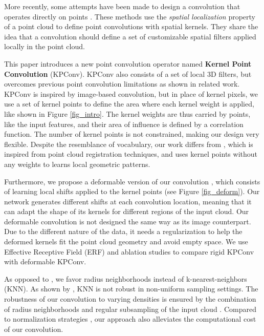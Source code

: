 \documentclass[10pt,twocolumn,letterpaper]{article}
\begin{document}
More recently, some attempts have been made to design a convolution that operates directly on points \cite{atzmon2018point, xu2018spidercnn, li2018pointcnn, hua2018pointwise, hermosilla2018monte}. These methods use the \textit{spatial localization} property of a point cloud to define point convolutions with spatial kernels. They share the idea that a convolution should define a set of customizable spatial filters applied locally in the point cloud. 

This paper introduces a new point convolution operator named \textbf{Kernel Point Convolution} (KPConv). KPConv also consists of a set of local 3D filters, but overcomes previous point convolution limitations as shown in related work. KPConv is inspired by image-based convolution, but in place of kernel pixels, we use a set of kernel points to define the area where each kernel weight is applied, like shown in Figure \ref{fig_intro}. The kernel weights are thus carried by points, like the input features, and their area of influence is defined by a correlation function. The number of kernel points is not constrained, making our design very flexible. Despite the resemblance of vocabulary, our work differs from \cite{shen2018mining}, which is inspired from point cloud registration techniques, and uses kernel points without any weights to learns local geometric patterns. 

Furthermore, we propose a deformable version of our convolution \cite{dai2017deformable}, which consists of learning local shifts applied to the kernel points (see Figure \ref{fig_deform}). Our network generates different shifts at each convolution location, meaning that it can adapt the shape of its kernels for different regions of the input cloud. Our deformable convolution is not designed the same way as its image counterpart. Due to the different nature of the data, it needs a regularization to help the deformed kernels fit the point cloud geometry and avoid empty space. We use Effective Receptive Field (ERF) \cite{luo2016understanding} and ablation studies to compare rigid KPConv with deformable KPConv.

As opposed to \cite{wang2018deep, atzmon2018point, xu2018spidercnn, li2018pointcnn}, we favor radius neighborhoods instead of k-nearest-neighbors (KNN). As shown by \cite{hermosilla2018monte}, KNN is not robust in non-uniform sampling settings. The robustness of our convolution to varying densities is ensured by the combination of radius neighborhoods and regular subsampling of the input cloud \cite{thomas2018semantic}. Compared to normalization strategies \cite{hermosilla2018monte, hua2018pointwise}, our approach also alleviates the computational cost of our convolution.
\end{document}
